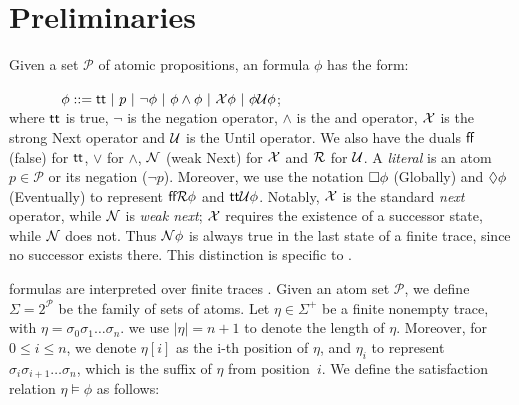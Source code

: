 

\section{Preliminaries}\label{sec:pre}
Given a set $\mathcal{P}$ of atomic propositions, an \ltlf formula
$\phi$ has the form:

$\ \ \ \ \ \ \ \ \ \ \ \phi ::= \true\ |\ p\ |\ \neg \phi\ |\ \phi\wedge\phi\ |\ \X\phi\ |\ \phi \U\phi$;\\
%
where $\textsf{tt}$ is true, $\neg$ is the negation operator, $\wedge$ is the and operator, $\mathcal{X}$ is the strong Next operator 
and  $\mathcal{U}$ is the Until operator. We also have the duals $\textsf{ff}$ (false) for $\textsf{tt}$, $\vee$ for $\wedge$, 
$\mathcal{N}$ (weak Next) for $\mathcal{X}$ and $\mathcal{R}$ for $\mathcal{U}$. A \emph{literal} is an atom $p\in\mathcal{P}$ or its negation ($\neg p$).
 Moreover, we use the notation $\Box\phi$ (Globally) and $\Diamond\phi$
(Eventually) to represent $\textsf{ff} \mathcal{R}\phi$ and $\textsf{tt} \mathcal{U}\phi$.
Notably, $\mathcal{X}$ is the standard \emph{next} operator, while $\mathcal{N}$ is \emph{weak next}; 
$\mathcal{X}$ requires the existence of a successor state, while $\mathcal{N}$ does not. 
Thus $\mathcal{N}\phi$ is always true in the last state of a finite trace, since no successor exists there.
This distinction is specific to \ltlf.

\ltlf formulas are interpreted over finite traces \cite{GV13}.
Given an atom set $\mathcal{P}$, we define $\Sigma = 2^{\mathcal{P}}$ be  the family of sets of atoms. Let
$\eta\in\Sigma^+$ be a finite nonempty trace, with $\eta=\sigma_0\sigma_1\ldots\sigma_n$. we use
$|\eta|=n+1$ to denote the length of $\eta$. Moreover, for $0\leq
i\leq n$, we denote $\eta[i]$ as the i-th position of $\eta$, and 
$\eta_i$ to represent $\sigma_i\sigma_{i+1}\ldots\sigma_n$, which is
the suffix of $\eta$ from position~$i$. We define the satisfaction relation $\eta\models\phi$ as follows:

